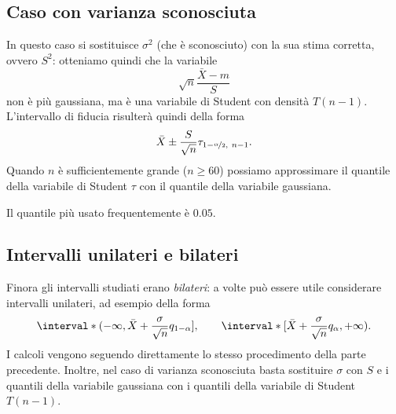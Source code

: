 \subsection*{Caso con varianza sconosciuta}

In questo caso si sostituisce $\sigma^2$ (che è sconosciuto) con la sua stima corretta, ovvero $S^2$: otteniamo quindi che la variabile \[
    \sqrt{n}\frac{\bar X - m}{S}    
\] non è più gaussiana, ma è una variabile di Student con densità $T(n-1)$. L'intervallo di fiducia risulterà quindi della forma \[
    \bar X \pm \frac{S}{\sqrt{n}}\tau_{1 - \nicefrac{\alpha}{2},\ n - 1}.    
\] Quando $n$ è sufficientemente grande ($n \geq 60$) possiamo approssimare il quantile della variabile di Student $\tau$ con il quantile della variabile gaussiana.

Il quantile più usato frequentemente è $0.05$.

\subsection{Intervalli unilateri e bilateri}

Finora gli intervalli studiati erano \emph{bilateri}: a volte può essere utile considerare intervalli unilateri, ad esempio della forma \[
    \interval*({-\infty, \bar X + \frac{\sigma}{\sqrt{n}}q_{1-\alpha}}], \qquad
    \interval*[{\bar X + \frac{\sigma}{\sqrt{n}}q_\alpha, +\infty}).
\] I calcoli vengono seguendo direttamente lo stesso procedimento della parte precedente. Inoltre, nel caso di varianza sconosciuta basta sostituire $\sigma$ con $S$ e i quantili della variabile gaussiana con i quantili della variabile di Student $T(n-1)$.
